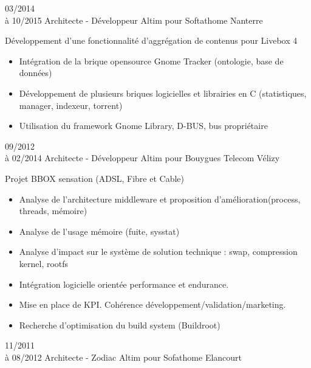 \documentclass[10pt,a4paper]{moderncv}       %
\begin{document}
\vspace*{3mm}
\cventry
{03/2014\\à 10/2015}       %
{Architecte - Développeur} %
{Altim pour Softathome}    %
{Nanterre}                 %
{}                         %
{
Développement d’une fonctionnalité d’aggrégation de contenus pour Livebox 4
\begin{itemize}
\setlength{\itemindent}{2mm}
  \item  Intégration de la brique opensource Gnome Tracker (ontologie, base de
données)
  \item Développement de plusieurs briques logicielles et librairies en C
 (statistiques, manager, indexeur, torrent)
  \item Utilisation du framework Gnome Library, D-BUS, bus propriétaire
\end{itemize}
}
\vspace*{3mm}
\cventry
{09/2012\\à 02/2014}          %
{Architecte - Développeur}    %
{Altim pour Bouygues Telecom} %
{Vélizy}                      %
{}                            %
{Projet BBOX sensation (ADSL, Fibre et Cable)
\begin{itemize}
\setlength{\itemindent}{2mm}
  \item Analyse de l’architecture middleware et proposition d’amélioration(process, threads, mémoire)
  \item Analyse de l’usage mémoire (fuite, sysstat)
  \item Analyse d’impact sur le système de solution technique : swap, compression kernel, rootfs
  \item Intégration logicielle orientée performance et endurance.
  \item Mise en place de KPI. Cohérence développement/validation/marketing.
  \item Recherche d’optimisation du build system (Buildroot)
\end{itemize}
}
\vspace*{3mm}
\cventry
{11/2011\\à 08/2012}   %
{Architecte - Zodiac}  %
{Altim pour Sofathome} %
{Elancourt}            %
{}                     %
\end{document}
